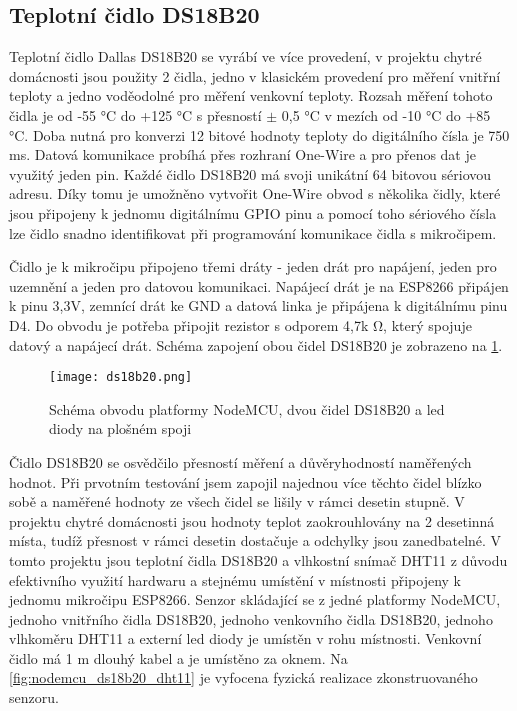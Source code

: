 \subsection{Teplotní čidlo DS18B20}
Teplotní čidlo Dallas DS18B20 se vyrábí ve více provedení, v projektu chytré domácnosti jsou použity 2 čidla, jedno v klasickém provedení pro měření vnitřní teploty a jedno voděodolné pro měření venkovní teploty. Rozsah měření tohoto čidla je od -55 \si{\degree}C do +125 \si{\degree}C s přesností $\pm$ 0,5 \si{\degree}C v mezích od -10 \si{\degree}C do +85 \si{\degree}C. Doba nutná pro konverzi 12 bitové hodnoty teploty do digitálního čísla je 750 ms. Datová komunikace probíhá přes rozhraní One-Wire a pro přenos dat je využitý jeden pin. Každé čidlo DS18B20 má svoji unikátní 64 bitovou sériovou adresu. Díky tomu je umožněno vytvořit One-Wire obvod s několika čidly, které jsou připojeny k jednomu digitálnímu GPIO pinu a pomocí toho sériového čísla lze čidlo snadno identifikovat při programování komunikace čidla s mikročipem. \par
Čidlo je k mikročipu připojeno třemi dráty - jeden drát pro napájení, jeden pro uzemnění a jeden pro datovou komunikaci. Napájecí drát je na ESP8266 připájen k pinu 3,3V, zemnící drát ke GND a datová linka je připájena k digitálnímu pinu D4. Do obvodu je potřeba připojit rezistor s odporem 4,7k \si{\ohm}, který spojuje datový a napájecí drát. Schéma zapojení obou čidel DS18B20 je zobrazeno na \cref{fig:schema_esp_ds18b20}.\par

\begin{figure}[H]
  \centering
  \texttt{[image: ds18b20.png]}
  \caption{Schéma obvodu platformy NodeMCU, dvou čidel DS18B20 a led diody na plošném spoji}
  \label{fig:schema_esp_ds18b20}
\end{figure}

Čidlo DS18B20 se osvědčilo přesností měření a důvěryhodností naměřených hodnot. Při prvotním testování jsem zapojil najednou více těchto čidel blízko sobě a naměřené hodnoty ze všech čidel se lišily v rámci desetin stupně. V projektu chytré domácnosti jsou hodnoty teplot zaokrouhlovány na 2 desetinná místa, tudíž přesnost v rámci desetin dostačuje a odchylky jsou zanedbatelné. V tomto projektu jsou teplotní čidla DS18B20 a vlhkostní snímač DHT11 z důvodu efektivního využití hardwaru a stejnému umístění v místnosti připojeny k jednomu mikročipu ESP8266. Senzor skládající se z jedné platformy NodeMCU, jednoho vnitřního čidla DS18B20, jednoho venkovního čidla DS18B20, jednoho vlhkoměru DHT11 a externí led diody je umístěn v rohu místnosti. Venkovní čidlo má 1 m dlouhý kabel a je umístěno za oknem. Na \cref{fig:nodemcu_ds18b20_dht11} je vyfocena fyzická realizace zkonstruovaného senzoru.

